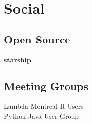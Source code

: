 \documentclass[letterpaper]{deedy-resume} %
\begin{document}
\begin{minipage}[t]{0.33\textwidth}

\sectionspace %


\section{Social}

\subsection{Open Source}

\href{https://starship.rs/}{\bf starship} \\

\sectionspace %

\subsection{Meeting Groups}

Lambda Montreal \textbullet{} R Users \\
Python \textbullet{} Java User Group

\sectionspace %


\end{minipage} %
\hfill
%
%
\end{document}
